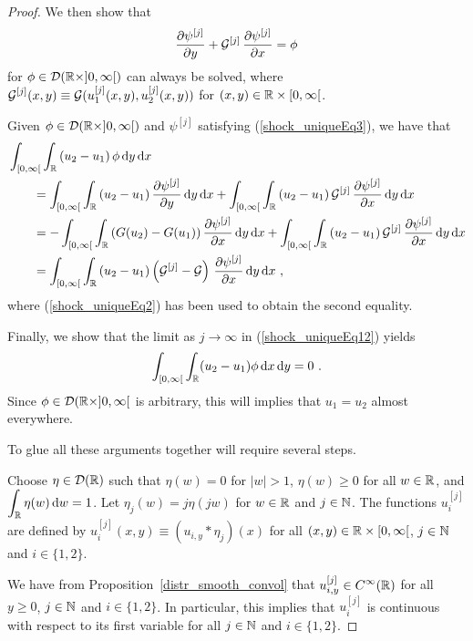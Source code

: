\begin{proof}
We then show that
\begin{equation} \label{shock_uniqueEq3}
\frac{\partial{\psi^{[j]}}}{\partial y} + {\cal G}^{[j]}\,\frac{\partial{\psi^{[j]}}}{\partial x} = \phi
\end{equation}
for $\phi \in \mathcal{D}(\mathbb{R}\times ]0,\infty[)$ can always be solved, where
$\displaystyle {\cal G}^{[j]}(x,y) \equiv
{\cal G}(u^{[j]}_1(x,y),u^{[j]}_2(x,y))$
for $(x,y) \in \mathbb{R} \times [0,\infty[$.

Given $\phi \in \mathcal{D}(\mathbb{R}\times ]0,\infty[)$ and $\displaystyle \psi^{[j]}$
satisfying (\ref{shock_uniqueEq3}), we have that
\begin{align}
&\int_{[0,\infty[} \int_{\mathbb{R}}
\left(u_2 - u_1 \right) \phi \,\mathrm{d}{y} \,\mathrm{d}{x} \nonumber \\
&\qquad = \int_{[0,\infty[} \int_{\mathbb{R}}
\left(u_2 - u_1 \right) \frac{\partial{\psi^{[j]}}}{\partial y} \,\mathrm{d}{y} \,\mathrm{d}{x}
+ \int_{[0,\infty[} \int_{\mathbb{R}}
\left(u_2 - u_1 \right) {\cal G}^{[j]}\,\frac{\partial{\psi^{[j]}}}{\partial x}  \,\mathrm{d}{y} \,\mathrm{d}{x}
\nonumber \\ 
&\qquad = - \int_{[0,\infty[} \int_{\mathbb{R}}
\left(G(u_2) - G(u_1) \right) \frac{\partial{\psi^{[j]}}}{\partial x} \,\mathrm{d}{y} \,\mathrm{d}{x}
+ \int_{[0,\infty[} \int_{\mathbb{R}}
\left(u_2 - u_1 \right) {\cal G}^{[j]}\,\frac{\partial{\psi^{[j]}}}{\partial x}  \,\mathrm{d}{y} \,\mathrm{d}{x}
\nonumber \\ 
&\qquad = \int_{[0,\infty[} \int_{\mathbb{R}}
\left(u_2 - u_1 \right)\left({\cal G}^{[j]} - {\cal G}\right)
\,\frac{\partial{\psi^{[j]}}}{\partial x} \,\mathrm{d}{y} \,\mathrm{d}{x} \ ,  \label{shock_uniqueEq12}
\end{align}
where (\ref{shock_uniqueEq2}) has been used to obtain the second
equality.

Finally, we show that the limit as $j\to \infty$ in
(\ref{shock_uniqueEq12}) yields
\[
\int_{[0,\infty[} \int_{\mathbb{R}} (u_2-u_1) \phi \,\mathrm{d}{x}\,\mathrm{d}{y} = 0 \ .
\]
Since $\phi \in \mathcal{D}(\mathbb{R}\times ]0,\infty[$ is arbitrary, this will
implies that $u_1 = u_2$ almost everywhere.

To glue all these arguments together will require several steps.

  Choose $\displaystyle \eta \in \mathcal{D}(\mathbb{R})$ such that
$\eta(w) = 0$ for $|w|>1$, $\eta(w) \geq 0$ for all $w\in \mathbb{R}$, and
$\displaystyle \int_{\mathbb{R}} \eta(w)\,\mathrm{d}{w} = 1$.
Let $\displaystyle \eta_j(w) = j \eta(j w)$ for
$w \in \mathbb{R}$ and $j \in \mathbb{N}$.  The functions $\displaystyle u_i^{[j]}$
are defined by $\displaystyle u_i^{[j]}(x,y) \equiv (u_{i,y} \ast \eta_j)(x)$
for all $(x,y) \in \mathbb{R}\times [0,\infty[$, $j\in \mathbb{N}$ and $i \in \{1,2\}$.

We have from Proposition~\ref{distr_smooth_convol} that
$\displaystyle u_{i,y}^{[j]} \in C^\infty(\mathbb{R})$ for all $y \geq 0$,
$j \in \mathbb{N}$ and $i\in \{1,2\}$.  In particular, this implies that
$\displaystyle u_{i}^{[j]}$ is continuous with respect to its first
variable for all $j \in \mathbb{N}$ and $i\in \{1,2\}$.


\end{proof}
